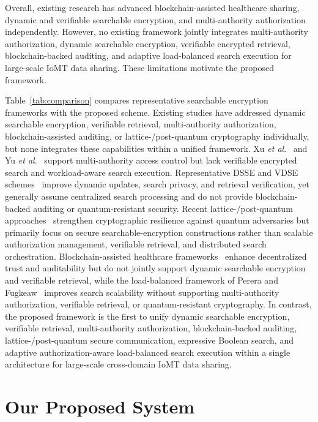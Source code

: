 \documentclass{ieeetj}
\theoremstyle{ieee-style}
\begin{document}
Overall, existing research has advanced blockchain-assisted healthcare sharing, dynamic and verifiable searchable encryption, and multi-authority authorization independently. However, no existing framework jointly integrates multi-authority authorization, dynamic searchable encryption, verifiable encrypted retrieval, blockchain-backed auditing, and adaptive load-balanced search execution for large-scale IoMT data sharing. These limitations motivate the proposed framework.

Table~\ref{tab:comparison} compares representative searchable encryption frameworks with the proposed scheme. Existing studies have addressed dynamic searchable encryption, verifiable retrieval, multi-authority authorization, blockchain-assisted auditing, or lattice-/post-quantum cryptography individually, but none integrates these capabilities within a unified framework. Xu \textit{et al}.~\cite{ref26} and Yu \textit{et al}.~\cite{ref28} support multi-authority access control but lack verifiable encrypted search and workload-aware search execution. Representative DSSE and VDSE schemes~\cite{ref29,ref35,ref46} improve dynamic updates, search privacy, and retrieval verification, yet generally assume centralized search processing and do not provide blockchain-backed auditing or quantum-resistant security. Recent lattice-/post-quantum approaches~\cite{ref16,ref41,ref52,ref54} strengthen cryptographic resilience against quantum adversaries but primarily focus on secure searchable-encryption constructions rather than scalable authorization management, verifiable retrieval, and distributed search orchestration. Blockchain-assisted healthcare frameworks~\cite{ref47,ref51} enhance decentralized trust and auditability but do not jointly support dynamic searchable encryption and verifiable retrieval, while the load-balanced framework of Perera and Fugkeaw~\cite{ref48} improves search scalability without supporting multi-authority authorization, verifiable retrieval, or quantum-resistant cryptography. In contrast, the proposed framework is the first to unify dynamic searchable encryption, verifiable retrieval, multi-authority authorization, blockchain-backed auditing, lattice-/post-quantum secure communication, expressive Boolean search, and adaptive authorization-aware load-balanced search execution within a single architecture for large-scale cross-domain IoMT data sharing.
\section{Our Proposed System}
\end{document}
